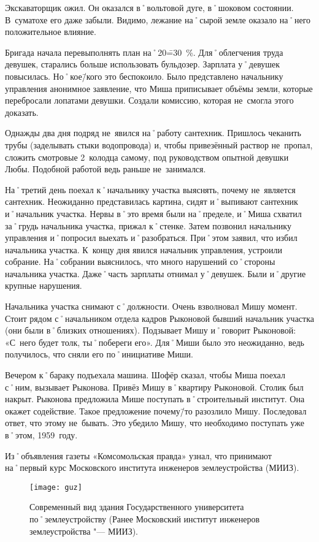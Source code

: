 Экскаваторщик ожил. Он оказался в˚вольтовой дуге, в˚шоковом состоянии. В~суматохе его даже забыли. Видимо, лежание на˚сырой земле оказало на˚него положительное влияние. 

Бригада начала перевыполнять план на˚20\==30~\%. Для˚облегчения труда девушек, старались больше использовать бульдозер. Зарплата у˚девушек повысилась. Но˚кое\=/кого это беспокоило. Было представлено начальнику управления анонимное заявление, что Миша приписывает объёмы земли, которые перебросали лопатами девушки. Создали комиссию, которая не~смогла этого доказать.

Однажды два дня подряд не~явился на˚работу сантехник. Пришлось чеканить трубы (заделывать стыки водопровода) и, чтобы привезённый раствор не~пропал, сложить смотровые 2~колодца самому, под руководством опытной девушки Любы. Подобной работой ведь раньше не~занимался.

На˚третий день поехал к˚начальнику участка выяснять, почему не~является сантехник. Неожиданно представилась картина, сидят и˚выпивают сантехник и˚начальник участка. Нервы в˚это время были на˚пределе, и˚Миша схватил за˚грудь начальника участка, прижал к˚стенке. Затем позвонил начальнику управления и˚попросил выехать и˚разобраться. При˚этом заявил, что избил начальника участка. К~концу дня явился начальник управления, устроили собрание. На˚собрании выяснилось, что много нарушений со˚стороны начальника участка. Даже˚часть зарплаты отнимал у˚девушек. Были и˚другие крупные нарушения.

Начальника участка снимают с˚должности. Очень взволновал Мишу момент. Стоит рядом с˚начальником отдела кадров Рыконовой бывший начальник участка (они были в˚близких отношениях). Подзывает Мишу и˚говорит Рыконовой: «С~него будет толк, ты˚побереги его». Для˚Миши было это неожиданно, ведь получилось, что сняли его по˚инициативе Миши. 

Вечером к˚бараку подъехала машина. Шофёр сказал, чтобы Миша поехал с˚ним, вызывает Рыконова. Привёз Мишу в˚квартиру Рыконовой. Столик был накрыт. Рыконова предложила Мише поступать в˚строительный институт. Она окажет содействие. Такое предложение почему\=/то разозлило Мишу. Последовал ответ, что этому не~бывать. Это убедило Мишу, что необходимо поступать уже в˚этом, 1959~году.

Из˚объявления газеты «Комсомольская правда» узнал, что принимают на˚первый курс Московского института инженеров землеустройства (МИИЗ).

\begin{wrapfigure}{O}{.4\textwidth}
\centering
\texttt{[image: guz]}
\caption[{Современный вид здания Государственного университета по˚землеустройству (Ранее Московский институт инженеров землеустройства "--- МИИЗ).}]{Современный вид здания Государственного университета по˚землеустройству (Ранее Московский институт инженеров землеустройства "--- МИИЗ)\footnotemark.}
\label{fig:guz}
\end{wrapfigure}

